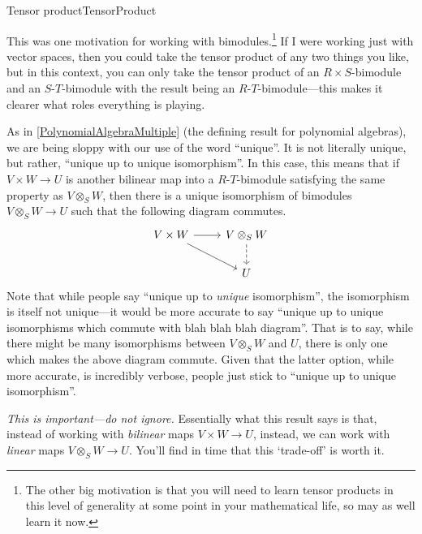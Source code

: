 \begin{thm}{Tensor product}{TensorProduct}
\begin{rmk}
		This was one motivation for working with bimodules.\footnote{The other big motivation is that you will need to learn tensor products in this level of generality at some point in your mathematical life, so may as well learn it now.}  If I were working just with vector spaces, then you could take the tensor product of any two things you like, but in this context, you can only take the tensor product of an $R\times S$-bimodule and an $S$-$T$-bimodule with the result being an $R$-$T$-bimodule---this makes it clearer what roles everything is playing. 
	\end{rmk}
	\begin{rmk}
		As in \cref{PolynomialAlgebraMultiple} (the defining result for polynomial algebras), we are being sloppy with our use of the word ``unique''.  It is not literally unique, but rather, ``unique up to unique isomorphism''.  In this case, this means that if $V\times W\rightarrow U$ is another bilinear map into a $R$-$T$-bimodule satisfying the same property as $V\otimes _SW$, then there is a unique isomorphism of bimodules $V\otimes _SW\rightarrow U$ such that the following diagram commutes.
		\begin{equation}
			\begin{tikzcd}
				V\times W \ar[r] \ar[rd] & V\otimes _SW \ar[d,dashed] \\
				& U
			\end{tikzcd}
		\end{equation}
		Note that while people say ``unique up to \emph{unique} isomorphism'', the isomorphism is itself not unique---it would be more accurate to say ``unique up to unique isomorphisms which commute with blah blah blah diagram''.  That is to say, while there might be many isomorphisms between $V\otimes _SW$ and $U$, there is only one which makes the above diagram commute.  Given that the latter option, while more accurate, is incredibly verbose, people just stick to ``unique up to unique isomorphism''.
	\end{rmk}
	\begin{rmk}
		\emph{This is important---do not ignore.}  Essentially what this result says is that, instead of working with \emph{bilinear} maps $V\times W\rightarrow U$, instead, we can work with \emph{linear} maps $V\otimes _SW\rightarrow U$.  You'll find in time that this `trade-off' is worth it.
		

\end{rmk}
\end{thm}
